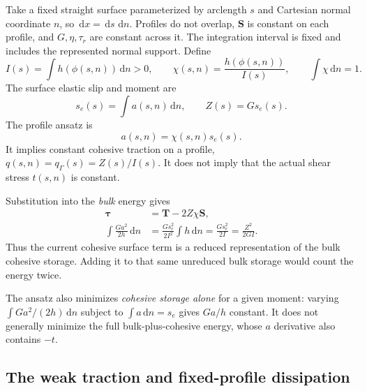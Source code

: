 \documentclass[11pt,a4paper]{article}
\numberwithin{equation}{section}
\newcommand{\dd}{\,\mathrm d}
\newcommand{\Sg}{\bm S}
\newcommand{\T}{\bm T}
\newcommand{\ta}{\bm\tau}
\begin{document}
Take a fixed straight surface parameterized by arclength $s$ and Cartesian
normal coordinate $n$, so $\dd x=\dd s\,\dd n$.
Profiles do not overlap, $\Sg$ is constant on each profile, and $G,\eta,\tau_r$
are constant across it. The integration interval is fixed and includes the
represented normal support. Define
\begin{equation}
 I(s)=\int h(\phi(s,n))\dd n>0,\qquad
 \chi(s,n)=\frac{h(\phi(s,n))}{I(s)},\qquad
 \int\chi\dd n=1.
 \label{eq:I}
\end{equation}
The surface elastic slip and moment are
\begin{equation}
 s_e(s)=\int a(s,n)\dd n,\qquad Z(s)=G s_e(s).
 \label{eq:moment}
\end{equation}
The profile ansatz is
\begin{equation}
 a(s,n)=\chi(s,n)s_e(s).
 \label{eq:ansatz}
\end{equation}
It implies constant cohesive traction on a profile,
$q(s,n)=q_\Gamma(s)=Z(s)/I(s)$.
It does not imply that the actual shear stress $t(s,n)$ is constant.

Substitution into the \emph{bulk} energy gives
\begin{align}
 \ta&=\T-2Z\chi\Sg,\\
 \int\frac{Ga^2}{2h}\dd n
    &=\frac{G s_e^2}{2I^2}\int h\dd n
      =\boxed{\frac{G s_e^2}{2I}=\frac{Z^2}{2GI}}.
 \label{eq:surfaceenergy}
\end{align}
Thus the current cohesive surface term is a reduced representation of the
bulk cohesive storage. Adding it to that same unreduced bulk storage would
count the energy twice.

The ansatz also minimizes \emph{cohesive storage alone} for a given moment:
varying $\int Ga^2/(2h)\dd n$ subject to $\int a\dd n=s_e$ gives $Ga/h$
constant. It does not generally minimize the full bulk-plus-cohesive energy,
whose $a$ derivative also contains $-t$.

\subsection{The weak traction and fixed-profile dissipation}
\end{document}
